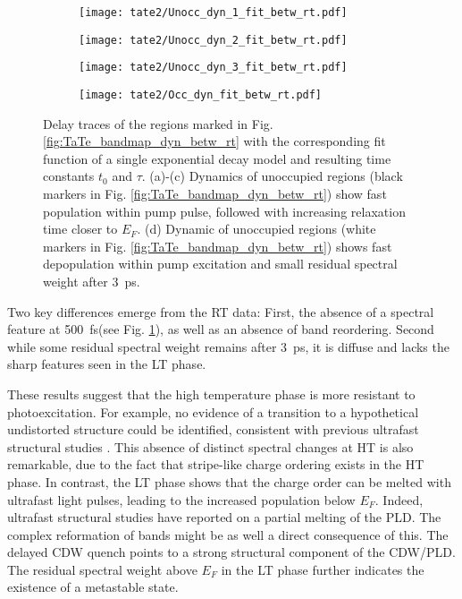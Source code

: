 \begin{figure}[b!]
	\centering
	\begin{subfigure}[b]{0.24\textwidth}
		\texttt{[image: tate2/Unocc\_dyn\_1\_fit\_betw\_rt.pdf]}
		\caption{}
	\end{subfigure}
	\begin{subfigure}[b]{0.24\textwidth}
		\texttt{[image: tate2/Unocc\_dyn\_2\_fit\_betw\_rt.pdf]}
		\caption{}
	\end{subfigure}
	\begin{subfigure}[b]{0.24\textwidth}
		\texttt{[image: tate2/Unocc\_dyn\_3\_fit\_betw\_rt.pdf]}
		\caption{}
	\end{subfigure}
	\begin{subfigure}[b]{0.24\textwidth}
		\texttt{[image: tate2/Occ\_dyn\_fit\_betw\_rt.pdf]}
		\caption{}
	\end{subfigure}
	\caption{
		Delay traces of the regions marked in Fig. \ref{fig:TaTe_bandmap_dyn_betw_rt} with the corresponding fit function of a single exponential decay model and resulting time constants $t_0$ and $\tau$. (a)-(c) Dynamics of unoccupied regions (black markers in Fig. \ref{fig:TaTe_bandmap_dyn_betw_rt}) show fast population within pump pulse, followed with increasing relaxation time closer to $E_F$. (d) Dynamic of unoccupied regions (white markers in Fig. \ref{fig:TaTe_bandmap_dyn_betw_rt}) shows fast depopulation within pump excitation and small residual spectral weight after \qty{3}{\pico\second}.}
	\label{fig:TaTe_dyn_betw_rt}
\end{figure}

Two key differences emerge from the RT data:
First, the absence of a spectral feature at \qty{500}{\femto\second}(see Fig. \ref{fig:TaTe_dyn_betw_rt}), as well as an absence of band reordering.
Second while some residual spectral weight remains after \qty{3}{\pico\second}, it is diffuse and lacks the sharp features seen in the LT phase.

These results suggest that the high temperature phase is more resistant to photoexcitation.
For example, no evidence of a transition to a hypothetical undistorted structure could be identified, consistent with previous ultrafast structural studies \cite{domrose_femtosecond_2024}.
This absence of distinct spectral changes at HT is also remarkable, due to the fact that stripe-like charge ordering exists in the HT phase.
In contrast, the LT phase shows that the charge order can be melted with ultrafast light pulses, leading to the increased population below $E_F$.
Indeed, ultrafast structural studies \cite{domrose_femtosecond_2024, siddiqui_ultrafast_2021} have reported on a partial melting of the PLD.
The complex reformation of bands might be as well a direct consequence of this.
The delayed CDW quench points to a strong structural component of the CDW/PLD.
The residual spectral weight above $E_F$ in the LT phase further indicates the existence of a metastable state.

